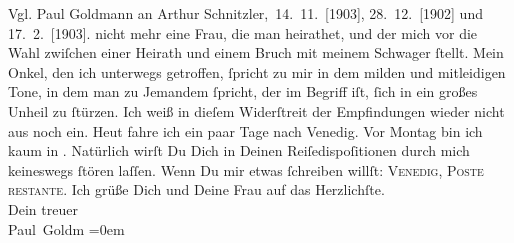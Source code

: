 \begin{ledgroupsized}[t]{13cm}
{{{                     Vgl. Paul Goldmann an Arthur Schnitzler, 14. 11. [1903], 28. 12. [1902] und 17. 2. [1903].}}}\label{K_L03386-3h} nicht
               mehr eine Frau, die man heirathet, und der mich vor die Wahl zwiſchen einer Heirath
               und einem Bruch mit meinem Schwager ſtellt. Mein Onkel, den ich unterwegs getroffen, ſpricht zu mir\strikeout{, \textcolor{gray}{dem}} in dem milden und mitleidigen Tone, in dem man zu Jemandem ſpricht, der im
               Begriff iſt, ſich in ein großes Unheil zu ſtürzen. Ich weiß in dieſem {\pb}Widerſtreit der Empfindungen wieder nicht aus noch
               ein.\pend
           \pstart
           Heut fahre ich ein paar Tage nach Venedig. Vor Montag bin ich kaum
               in \label{K_L03386-4v}\label{K_L03386-4h}. Natürlich wirſt Du Dich in
               Deinen Reiſedispoſitionen durch mich keineswegs ſtören laſſen. Wenn Du mir etwas
               ſchreiben willſt: \textsc{Venedig, Poste restante}.\pend
           \pstart
           Ich grüße Dich und Deine Frau auf das Herzlichſte. {\\[\baselineskip]}Dein treuer {\\[\baselineskip]}\spacefill\mbox{Paul Goldm}\pend
           \leftskip=0em{}
         
         \endnumbering{}\end{ledgroupsized}\begin{anhang}\end{anhang}\newcommand{\dateiname}{L03386}\newcommand{\titel}{Paul Goldmann an Arthur Schnitzler, 7. 9. 1903}\newcommand{\editorInnen}{Martin Anton Müller und Laura Untner}
      